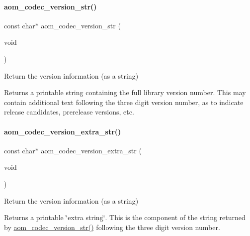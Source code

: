 \paragraph{\texorpdfstring{aom\+\_\+codec\+\_\+version\+\_\+str()}{aom\_codec\_version\_str()}}
{\footnotesize\ttfamily const char$\ast$ aom\+\_\+codec\+\_\+version\+\_\+str (\begin{DoxyParamCaption}\item[{void}]{ }\end{DoxyParamCaption})}



Return the version information (as a string) 

Returns a printable string containing the full library version number. This may contain additional text following the three digit version number, as to indicate release candidates, prerelease versions, etc. \mbox{\label{group__codec_gadde8130d243e6228f6bfedc98f2e3532}} 
\paragraph{\texorpdfstring{aom\+\_\+codec\+\_\+version\+\_\+extra\+\_\+str()}{aom\_codec\_version\_extra\_str()}}
{\footnotesize\ttfamily const char$\ast$ aom\+\_\+codec\+\_\+version\+\_\+extra\+\_\+str (\begin{DoxyParamCaption}\item[{void}]{ }\end{DoxyParamCaption})}



Return the version information (as a string) 

Returns a printable \char`\"{}extra string\char`\"{}. This is the component of the string returned by \hyperlink{group__codec_ga62d45353664dd1e1cb0868d6fdb77552}{aom\+\_\+codec\+\_\+version\+\_\+str()} following the three digit version number. \mbox{\label{group__codec_gaf72432504daf378befd8b3c122f14c01}} 
